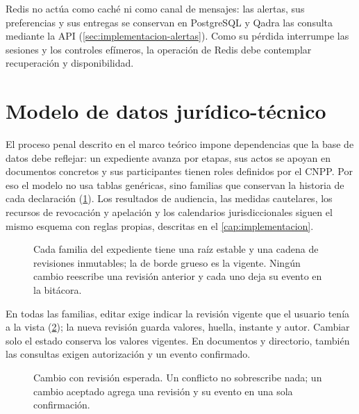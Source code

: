 Redis no actúa como caché ni como canal de mensajes: las alertas, sus preferencias y sus entregas se conservan en PostgreSQL y Qadra las consulta mediante la API (\cref{sec:implementacion-alertas}). Como su pérdida interrumpe las sesiones y los controles efímeros, la operación de Redis debe contemplar recuperación y disponibilidad.

\section{Modelo de datos jurídico-técnico}\label{sec:modelo-juridico}

El proceso penal descrito en el marco teórico impone dependencias que la base de datos debe reflejar: un expediente avanza por etapas, sus actos se apoyan en documentos concretos y sus participantes tienen roles definidos por el CNPP. Por eso el modelo no usa tablas genéricas, sino familias que conservan la historia de cada declaración (\cref{fig:modelo-expediente}). Los resultados de audiencia, las medidas cautelares, los recursos de revocación y apelación y los calendarios jurisdiccionales siguen el mismo esquema con reglas propias, descritas en el \cref{cap:implementacion}.

\begin{figure}[!tbp]
  \centering
  
  \caption{Cada familia del expediente tiene una raíz estable y una cadena de revisiones inmutables; la de borde grueso es la vigente. Ningún cambio reescribe una revisión anterior y cada uno deja su evento en la bitácora.}
  \label{fig:modelo-expediente}
\end{figure}

En todas las familias, editar exige indicar la revisión vigente que el usuario tenía a la vista (\cref{fig:revision-esperada}); la nueva revisión guarda valores, huella, instante y autor. Cambiar solo el estado conserva los valores vigentes. En documentos y directorio, también las consultas exigen autorización y un evento confirmado.

\begin{figure}[!tbp]
  \centering
  
  \caption{Cambio con revisión esperada. Un conflicto no sobrescribe nada; un cambio aceptado agrega una revisión y su evento en una sola confirmación.}
  \label{fig:revision-esperada}
\end{figure}

